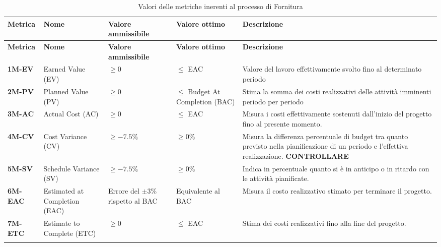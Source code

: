 \begin{longtable}{|>{\centering\arraybackslash}p{}|>{\centering\arraybackslash}p{}|>{\centering\arraybackslash}p{}|>{\centering\arraybackslash}p{}|>{\centering\arraybackslash}p{}|}
    \hline
    \textbf{Metrica} & \textbf{Nome} & \textbf{Valore ammissibile} & \textbf{Valore ottimo}& \textbf{Descrizione}\\
	\hline
    \endfirsthead
    \hline
    \textbf{Metrica} & \textbf{Nome} & \textbf{Valore ammissibile} & \textbf{Valore ottimo}& \textbf{Descrizione}\\
    \endhead
    \textbf{1M-EV} & Earned Value (EV) & $\geq 0$ & $\leq$ EAC & Valore del lavoro effettivamente svolto fino al determinato periodo\\
    \hline
	\textbf{2M-PV} 	& Planned Value (PV) 			& $\geq 0$ 						& $\leq$ Budget At Completion (BAC) &  Stima la somma dei costi realizzativi delle attività imminenti periodo per periodo\\ 
	\hline
	\textbf{3M-AC} 	& Actual Cost (AC) 				& $\geq 0$ 						& $\leq$ EAC &	Misura i costi effettivamente sostenuti dall'inizio del progetto fino al presente momento.\\ 
	\hline
	\textbf{4M-CV} 	& Cost Variance (CV) 			& $\geq -7.5\%$ 				& $\geq 0\%$ & Misura la differenza percentuale di budget tra quanto previsto nella pianificazione di un periodo e l'effettiva realizzazione. \textbf{CONTROLLARE}\\ 
	\hline
	\textbf{5M-SV} 	& Schedule Variance (SV) 		& $\geq -7.5\%$ 				& $\geq 0\%$ &Indica in percentuale quanto si è in anticipo o in ritardo con le attività pianificate.\\ 
	\hline
	\textbf{6M-EAC} 	& Estimated at Completion (EAC) & Errore del $\pm 3\%$ rispetto al BAC  & Equivalente al BAC & Misura il costo realizzativo stimato per terminare il progetto.\\ 
	\hline
	\textbf{7M-ETC} 	& Estimate to Complete (ETC)  	& $\geq 0$						 & $\leq$ EAC & Stima dei costi realizzativi fino alla fine del progetto.\\ 
	\hline
    \caption{Valori delle metriche inerenti al processo di Fornitura}
    \label{table:1}
\end{longtable}

